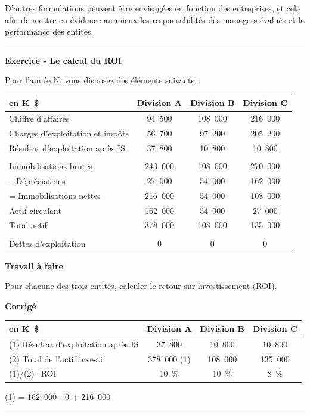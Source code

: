 \documentclass[oneside]{kaobook}
\begin{document}
D'autres formulations peuvent être envisagées en fonction des entreprises, et cela afin de mettre en évidence au mieux les responsabilités des managers évalués et la performance des entités.

\noindent\rule{\textwidth}{0.5pt}
\textbf{Exercice - Le calcul du ROI}

Pour l'année N, vous disposez des éléments suivants :
\begin{center}
\sidenotesize
\begin{tabular}{l c c c}
en K \$ & Division A & Division B & Division C\\
\hline
Chiffre d'affaires & 94 500 & 108 000 & 216 000\\
Charges d'exploitation et impôts & 56 700 & 97 200 & 205 200\\
Résultat d'exploitation après IS & 37 800 & 10 800 & 10 800\\
 &  &  & \\
Immobilisations brutes & 243 000 & 108 000 & 270 000\\
-- Dépréciations & 27 000 & 54 000 & 162 000\\
= Immobilisations nettes & 216 000 & 54 000 & 108 000\\
Actif circulant & 162 000 & 54 000 & 27 000\\
Total actif & 378 000 & 108 000 & 135 000\\
 &  &  & \\
Dettes d'exploitation & 0 & 0 & 0\\
\end{tabular}
\end{center}

\textbf{Travail à faire}

Pour chacune des trois entités, calculer le retour sur investissement
(ROI).

\textbf{Corrigé}
\begin{center}
\sidenotesize
\begin{tabular}{l c c c}
en K \$ & Division A & Division B & Division C\\
\hline
(1) Résultat d'exploitation après IS & 37 800 & 10 800 & 10 800\\
(2) Total de l'actif investi & 378 000 (1) & 108 000 & 135 000\\
(1)/(2)=ROI & 10 \% & 10 \% & 8 \%\\
\end{tabular}
\end{center}
(1) = 162 000 - 0 + 216 000

\noindent\rule{\textwidth}{0.5pt}
\end{document}
